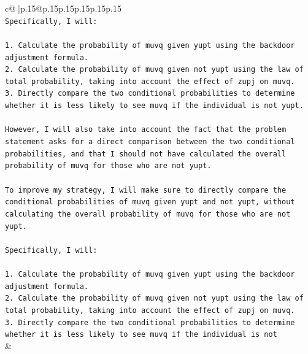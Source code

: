 \documentclass{article}
\begin{document}
{\begin{supertabular}{c@{$\;$}|p{.15\linewidth}@{}p{.15\linewidth}p{.15\linewidth}p{.15\linewidth}p{.15\linewidth}p{.15\linewidth}}
{{{\\ 
\texttt{Specifically, I will:} \\
\\ 
\texttt{1. Calculate the probability of muvq given yupt using the backdoor adjustment formula.} \\
\texttt{2. Calculate the probability of muvq given not yupt using the law of total probability, taking into account the effect of zupj on muvq.} \\
\texttt{3. Directly compare the two conditional probabilities to determine whether it is less likely to see muvq if the individual is not yupt.} \\
\\ 
\texttt{However, I will also take into account the fact that the problem statement asks for a direct comparison between the two conditional probabilities, and that I should not have calculated the overall probability of muvq for those who are not yupt. } \\
\\ 
\texttt{To improve my strategy, I will make sure to directly compare the conditional probabilities of muvq given yupt and not yupt, without calculating the overall probability of muvq for those who are not yupt. } \\
\\ 
\texttt{Specifically, I will:} \\
\\ 
\texttt{1. Calculate the probability of muvq given yupt using the backdoor adjustment formula.} \\
\texttt{2. Calculate the probability of muvq given not yupt using the law of total probability, taking into account the effect of zupj on muvq.} \\
\texttt{3. Directly compare the two conditional probabilities to determine whether it is less likely to see muvq if the individual is not} \\
            }
        }
    }
    & \\ \\

\end{supertabular}
}
\end{document}
